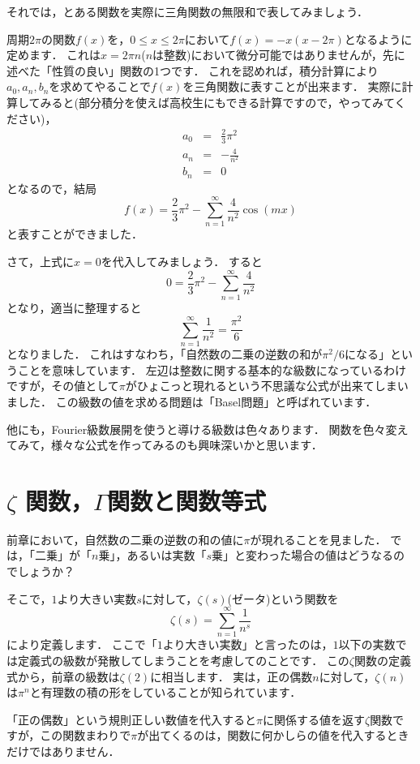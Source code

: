 それでは，とある関数を実際に三角関数の無限和で表してみましょう．

周期$2 \pi$の関数$f(x)$を，$0 \le x \le 2\pi$において$f(x)=-x(x-2 \pi)$となるように定めます．
これは$x=2\pi n$($n$は整数)において微分可能ではありませんが，先に述べた「性質の良い」関数の1つです．
これを認めれば，積分計算により$a_0, a_n, b_n$を求めてやることで$f(x)$を三角関数に表すことが出来ます．
実際に計算してみると(部分積分を使えば高校生にもできる計算ですので，やってみてください)，
\begin{eqnarray*}
	a_0 &=& \frac{2}{3}\pi ^2 \\
	a_n &=& -\frac{4}{n^2} \\
	b_n &=& 0
\end{eqnarray*}
となるので，結局
\[
	f(x)=\frac{2}{3}\pi ^2-\sum_{n=1}^{\infty} \frac{4}{n^2} \cos (mx)
\]
と表すことができました．

さて，上式に$x=0$を代入してみましょう．
すると
\[
	0=\frac{2}{3}\pi ^2-\sum_{n=1}^{\infty} \frac{4}{n^2}
\]
となり，適当に整理すると
\[
	\sum_{n=1}^{\infty} \frac{1}{n^2} = \frac{\pi ^2}{6}
\]
となりました．
これはすなわち，「自然数の二乗の逆数の和が$\pi ^2 /6$になる」ということを意味しています．
左辺は整数に関する基本的な級数になっているわけですが，その値として$\pi$がひょこっと現れるという不思議な公式が出来てしまいました．
この級数の値を求める問題は「Basel問題」と呼ばれています．

他にも，Fourier級数展開を使うと導ける級数は色々あります．
関数を色々変えてみて，様々な公式を作ってみるのも興味深いかと思います．

\section{$\zeta$ 関数，$\Gamma$関数と関数等式}

前章において，自然数の二乗の逆数の和の値に$\pi$が現れることを見ました．
では，「二乗」が「$n$乗」，あるいは実数「$s$乗」と変わった場合の値はどうなるのでしょうか？

そこで，$1$より大きい実数$s$に対して，$\zeta (s)$(ゼータ)という関数を
\[
	\zeta (s) = \sum_{n=1}^{\infty} \frac{1}{n^{s}}
\]
により定義します．
ここで「$1$より大きい実数」と言ったのは，$1$以下の実数では定義式の級数が発散してしまうことを考慮してのことです．
この$\zeta$関数の定義式から，前章の級数は$\zeta (2)$に相当します．
実は，正の偶数$n$に対して，$\zeta (n)$は$\pi ^{n}$と有理数の積の形をしていることが知られています．

「正の偶数」という規則正しい数値を代入すると$\pi$に関係する値を返す$\zeta$関数ですが，この関数まわりで$\pi$が出てくるのは，関数に何かしらの値を代入するときだけではありません．

